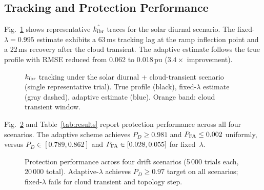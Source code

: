 \documentclass[journal]{IEEEtran}
\newcommand{\kibr}{k_{\rm ibr}}
\begin{document}
\subsection{Tracking and Protection Performance}

Fig.~\ref{fig:tracking} shows representative $\hat{\kibr}$ traces for
the solar diurnal scenario.  The fixed-$\lambda = 0.995$ estimate
exhibits a 63\,ms tracking lag at the ramp inflection point and
a 22\,ms recovery after the cloud transient.  The adaptive estimate
follows the true profile with RMSE reduced from 0.062 to
0.018\,pu ($3.4\times$ improvement).

\begin{figure}[htbp]
  \centering
  
  \caption{$\kibr$ tracking under the solar diurnal + cloud-transient
           scenario (single representative trial).  True profile (black),
           fixed-$\lambda$ estimate (gray dashed), adaptive estimate (blue).
           Orange band: cloud transient window.}
  \label{fig:tracking}
\end{figure}

Fig.~\ref{fig:pd_pfa} and Table~\ref{tab:results} report protection
performance across all four scenarios.  The adaptive scheme achieves
$P_D \geq 0.981$ and $P_{\rm FA} \leq 0.002$ uniformly, versus
$P_D \in [0.789, 0.862]$ and $P_{\rm FA} \in [0.028, 0.055]$ for
fixed~$\lambda$.

\begin{figure}[htbp]
  \centering
  
  \caption{Protection performance across four drift scenarios (5\,000
           trials each, 20\,000 total).  Adaptive-$\lambda$ achieves
           $P_D \geq 0.97$ target on all scenarios; fixed-$\lambda$
           fails for cloud transient and topology step.}
  \label{fig:pd_pfa}
\end{figure}
\end{document}
